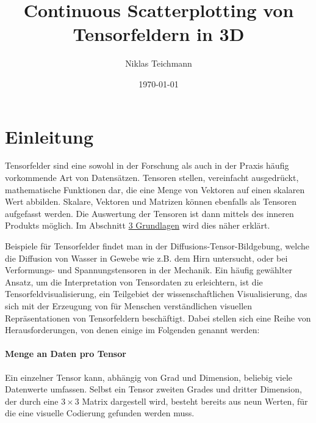 \documentclass[a4paper,fontsize=12pt,toc=bib,halfparskip]{scrartcl}
\title{Continuous Scatterplotting von Tensorfeldern in 3D\xspace}
\author{Niklas Teichmann}
\date{\today}
\begin{document}
\maketitle\clearpage
\thispagestyle{empty}
\tableofcontents
\thispagestyle{empty}
\clearpage



\section{Einleitung}
Tensorfelder sind eine sowohl in der Forschung als auch in der Praxis h\"aufig vorkommende Art von Datens\"atzen. Tensoren stellen, vereinfacht ausgedr\"uckt, mathematische Funktionen dar, die eine Menge von Vektoren auf einen skalaren Wert abbilden. Skalare, Vektoren und Matrizen können ebenfalls als Tensoren aufgefasst werden. Die Auswertung der Tensoren ist dann mittels des inneren Produkts möglich. Im Abschnitt \hyperref[sec:Grundlagen]{3 Grundlagen} wird dies näher erklärt.

Beispiele f\"ur Tensorfelder findet man in der Diffusions-Tensor-Bildgebung\cite{basser1994mr}, welche die Diffusion von Wasser in Gewebe wie z.B. dem Hirn untersucht, oder bei Verformungs-\cite[S.~122]{FundamentalsofStructuralMechanics} und Spannungstensoren\cite[S.~154]{FundamentalsofStructuralMechanics} in der Mechanik. Ein h\"aufig gew\"ahlter Ansatz, um die Interpretation von Tensordaten zu erleichtern, ist die Tensorfeldvisualisierung, ein Teilgebiet der wissenschaftlichen Visualisierung, das sich mit der Erzeugung von f\"ur Menschen verst\"andlichen visuellen Repr\"asentationen von Tensorfeldern besch\"aftigt. Dabei stellen sich eine Reihe von Herausforderungen, von denen einige im Folgenden genannt werden\cite{hlawitschka2014top}\cite{fritzsch2016continuousScatterplot}:

\paragraph{Menge an Daten pro Tensor}
Ein einzelner Tensor kann, abh\"angig von Grad und Dimension, beliebig viele Datenwerte umfassen. Selbst ein Tensor zweiten Grades und dritter Dimension, der durch eine $3 \times 3$ Matrix dargestell wird, besteht bereits aus neun Werten, f\"ur die eine visuelle Codierung gefunden werden muss.
\end{document}
